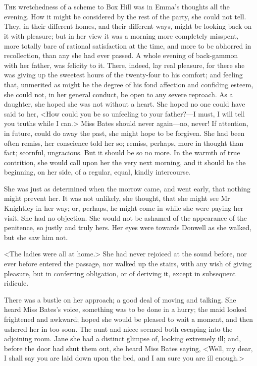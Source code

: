 \chapter[Chapter \thechapter]{}
\lettrine[lraise=0.3]{T}{he} wretchedness of a scheme to Box Hill was in Emma's thoughts all the evening. How it might be considered by the rest of the party, she could not tell. They, in their different homes, and their different ways, might be looking back on it with pleasure; but in her view it was a morning more completely misspent, more totally bare of rational satisfaction at the time, and more to be abhorred in recollection, than any she had ever passed. A whole evening of back-gammon with her father, was felicity to it. There, indeed, lay real pleasure, for there she was giving up the sweetest hours of the twenty-four to his comfort; and feeling that, unmerited as might be the degree of his fond affection and confiding esteem, she could not, in her general conduct, be open to any severe reproach. As a daughter, she hoped she was not without a heart. She hoped no one could have said to her, <How could you be so unfeeling to your father?—I must, I will tell you truths while I can.> Miss Bates should never again—no, never! If attention, in future, could do away the past, she might hope to be forgiven. She had been often remiss, her conscience told her so; remiss, perhaps, more in thought than fact; scornful, ungracious. But it should be so no more. In the warmth of true contrition, she would call upon her the very next morning, and it should be the beginning, on her side, of a regular, equal, kindly intercourse.

She was just as determined when the morrow came, and went early, that nothing might prevent her. It was not unlikely, she thought, that she might see Mr Knightley in her way; or, perhaps, he might come in while she were paying her visit. She had no objection. She would not be ashamed of the appearance of the penitence, so justly and truly hers. Her eyes were towards Donwell as she walked, but she saw him not.

<The ladies were all at home.> She had never rejoiced at the sound before, nor ever before entered the passage, nor walked up the stairs, with any wish of giving pleasure, but in conferring obligation, or of deriving it, except in subsequent ridicule.

There was a bustle on her approach; a good deal of moving and talking. She heard Miss Bates's voice, something was to be done in a hurry; the maid looked frightened and awkward; hoped she would be pleased to wait a moment, and then ushered her in too soon. The aunt and niece seemed both escaping into the adjoining room. Jane she had a distinct glimpse of, looking extremely ill; and, before the door had shut them out, she heard Miss Bates saying, <Well, my dear, I shall say you are laid down upon the bed, and I am sure you are ill enough.>

